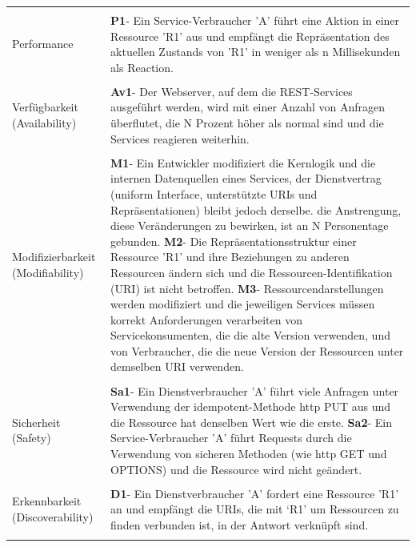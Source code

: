 \documentclass{acmsiggraph}
\begin{document}
\begin{center}
\begin{xtabular}{|C{2cm}|L{6cm}|}
 \\ 
    \hline
    & \\[-2ex]
     Performance & 
     \textbf{P1}- Ein Service-Verbraucher 'A' führt eine Aktion in einer Ressource 'R1' aus und empfängt die Repräsentation des aktuellen Zustands von 'R1' in weniger als n Millisekunden als Reaction.\\ 
       \hline
       & \\[-2ex]
     Verfügbarkeit (Availability) & 
     \textbf{Av1}- Der Webserver, auf dem die REST-Services ausgeführt werden, wird mit einer Anzahl von Anfragen überflutet, die N Prozent höher als normal sind und die Services reagieren weiterhin.
 \\ 
 \hline
 & \\[-2ex]
     Modifizierbarkeit  (Modifiability) & 
     \textbf{M1}- Ein Entwickler modifiziert die Kernlogik und die internen Datenquellen eines  Services, der Dienstvertrag (uniform Interface, unterstützte URIs und Repräsentationen) bleibt jedoch derselbe. die Anstrengung, diese Veränderungen zu bewirken, ist an N Personentage gebunden.\newline
\textbf{M2}- Die Repräsentationsstruktur einer Ressource 'R1' und ihre Beziehungen zu anderen Ressourcen ändern sich und die Ressourcen-Identifikation (URI) ist nicht betroffen.\newline
\textbf{M3}- Ressourcendarstellungen werden modifiziert und die jeweiligen Services müssen korrekt Anforderungen  verarbeiten von Servicekonsumenten, die die alte Version verwenden, und von Verbraucher, die die neue Version der Ressourcen unter demselben URI verwenden.
 \\ 
       \hline
       & \\[-2ex]
     Sicherheit  (Safety) & 
     \textbf{Sa1}- Ein Dienstverbraucher 'A' führt viele Anfragen unter Verwendung der idempotent-Methode http PUT aus und die Ressource hat denselben Wert wie die erste. \newline
\textbf{Sa2}- Ein Service-Verbraucher 'A' führt Requests durch die Verwendung von sicheren Methoden (wie http GET und OPTIONS) und die Ressource wird nicht geändert.
 \\ 
     \hline 
     & \\[-2ex]
   Erkennbarkeit  (Discoverability) & 
     \textbf{D1}- Ein Dienstverbraucher 'A' fordert eine Ressource 'R1' an und empfängt die URIs, die mit ‘R1’ um Ressourcen zu finden verbunden ist, in der Antwort verknüpft sind.
 \\ 
    \hline 
      & \\[-2ex]

\end{xtabular}
\end{center}
\end{document}
